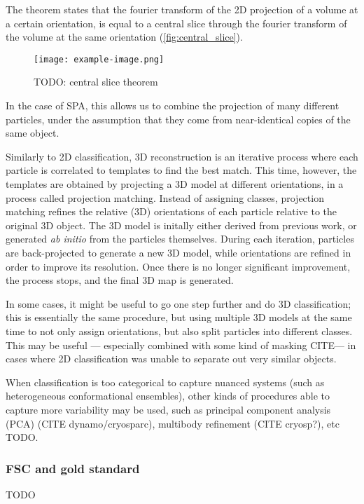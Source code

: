 The theorem states that the fourier transform of the 2D projection of a volume at a certain orientation, is equal to a central slice through the fourier transform of the volume at the same orientation (\autoref{fig:central_slice}).

\begin{figure}[ht]
    \centering
    \texttt{[image: example-image.png]}
    \caption{TODO: central slice theorem}
    \label{fig:central_slice}
\end{figure}

In the case of SPA, this allows us to combine the projection of many different particles, under the assumption that they come from near-identical copies of the same object.

Similarly to 2D classification, 3D reconstruction is an iterative process where each particle is correlated to templates to find the best match.
This time, however, the templates are obtained by projecting a 3D model at different orientations, in a process called projection matching.
Instead of assigning classes, projection matching refines the relative (3D) orientations of each particle relative to the original 3D object.
The 3D model is initally either derived from previous work, or generated \textit{ab initio} from the particles themselves.
During each iteration, particles are back-projected to generate a new 3D model, while orientations are refined in order to improve its resolution.
Once there is no longer significant improvement, the process stops, and the final 3D map is generated.

In some cases, it might be useful to go one step further and do 3D classification; this is essentially the same procedure, but using multiple 3D models at the same time to not only assign orientations, but also split particles into different classes.
This may be useful --- especially combined with some kind of masking CITE--- in cases where 2D classification was unable to separate out very similar objects.

When classification is too categorical to capture nuanced systems (such as heterogeneous conformational ensembles), other kinds of procedures able to capture more variability may be used, such as principal component analysis (PCA) (CITE dynamo/cryosparc), multibody refinement (CITE cryosp?), etc TODO.

\subsubsection{FSC and gold standard}
TODO

